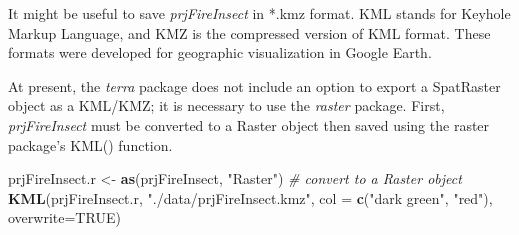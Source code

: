 \documentclass[
]{article}
\newenvironment{Shaded}{\begin{snugshade}}{\end{snugshade}}
\newcommand{\AttributeTok}[1]{\textcolor[rgb]{0.13,0.29,0.53}{#1}}
\newcommand{\CommentTok}[1]{\textcolor[rgb]{0.56,0.35,0.01}{\textit{#1}}}
\newcommand{\ConstantTok}[1]{\textcolor[rgb]{0.56,0.35,0.01}{#1}}
\newcommand{\DecValTok}[1]{\textcolor[rgb]{0.00,0.00,0.81}{#1}}
\newcommand{\FloatTok}[1]{\textcolor[rgb]{0.00,0.00,0.81}{#1}}
\newcommand{\FunctionTok}[1]{\textcolor[rgb]{0.13,0.29,0.53}{\textbf{#1}}}
\newcommand{\NormalTok}[1]{#1}
\newcommand{\OtherTok}[1]{\textcolor[rgb]{0.56,0.35,0.01}{#1}}
\newcommand{\SpecialCharTok}[1]{\textcolor[rgb]{0.81,0.36,0.00}{\textbf{#1}}}
\newcommand{\StringTok}[1]{\textcolor[rgb]{0.31,0.60,0.02}{#1}}
\begin{document}
\begin{Shaded}
\end{Shaded}

It might be useful to save \emph{prjFireInsect} in *.kmz format. KML
stands for Keyhole Markup Language, and KMZ is the compressed version of
KML format. These formats were developed for geographic visualization in
Google Earth.

At present, the \emph{terra} package does not include an option to
export a SpatRaster object as a KML/KMZ; it is necessary to use the
\emph{raster} package. First, \emph{prjFireInsect} must be converted to
a Raster object then saved using the raster package's KML() function.

\begin{Shaded}
\begin{Highlighting}[]
\NormalTok{prjFireInsect.r }\OtherTok{\textless{}{-}} \FunctionTok{as}\NormalTok{(prjFireInsect, }\StringTok{"Raster"}\NormalTok{)  }\CommentTok{\# convert to a \textquotesingle{}Raster\textquotesingle{} object}
\FunctionTok{KML}\NormalTok{(prjFireInsect.r, }\StringTok{"./data/prjFireInsect.kmz"}\NormalTok{, }\AttributeTok{col =} \FunctionTok{c}\NormalTok{(}\StringTok{"dark green"}\NormalTok{, }\StringTok{"red"}\NormalTok{), }\AttributeTok{overwrite=}\ConstantTok{TRUE}\NormalTok{)}
\end{Highlighting}
\end{Shaded}
\end{document}
